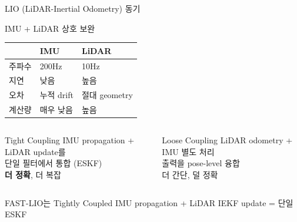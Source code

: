 \begin{frame}{LIO (LiDAR-Inertial Odometry) 동기}
  \begin{block}{IMU + LiDAR 상호 보완}
    \begin{center}
      \begin{tabular}{lll}
        \hline
        & \textbf{IMU} & \textbf{LiDAR} \\
        \hline
        주파수 & 200Hz & 10Hz \\
        지연 & 낮음 & 높음 \\
        오차 & 누적 drift & 절대 geometry \\
        계산량 & 매우 낮음 & 높음 \\
        \hline
      \end{tabular}
    \end{center}
  \end{block}
  \pause
  \begin{columns}
    \begin{block}{Tight Coupling}
      IMU propagation + LiDAR update를\\
      단일 필터에서 통합 (ESKF)\\
      \textbf{더 정확}, 더 복잡
    \end{block}
    \begin{block}{Loose Coupling}
      LiDAR odometry + IMU 별도 처리\\
      출력을 pose-level 융합\\
      더 간단, 덜 정확
    \end{block}
  \end{columns}
  \pause
  \begin{alertblock}{FAST-LIO는 Tightly Coupled}
    IMU propagation + LiDAR IEKF update = 단일 ESKF
  \end{alertblock}
\end{frame}

